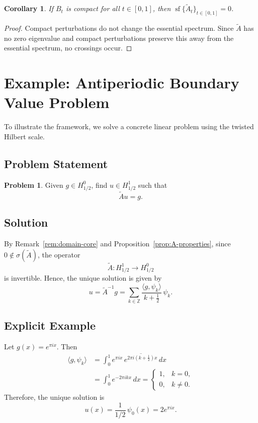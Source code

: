 \documentclass[11pt]{amsart}
\newtheorem{corollary}[theorem]{Corollary}
\theoremstyle{definition}
\newtheorem{problem}[theorem]{Problem}
\theoremstyle{remark}
\begin{document}
\begin{corollary}
If $B_t$ is compact for all $t \in [0,1]$, then $\operatorname{sf}\{\widetilde{A}_t\}_{t \in [0,1]} = 0$.
\end{corollary}

\begin{proof}
Compact perturbations do not change the essential spectrum. Since $\widetilde{A}$ has no zero eigenvalue and compact perturbations preserve this away from the essential spectrum, no crossings occur.
\end{proof}

\section{Example: Antiperiodic Boundary Value Problem}
\label{sec:example}

To illustrate the framework, we solve a concrete linear problem using the twisted Hilbert scale.

\subsection{Problem Statement}

\begin{problem}
Given $g\in H^0_{1/2}$, find $u\in H^1_{1/2}$ such that
\[
\widetilde{A}u = g .
\]
\end{problem}

\subsection{Solution}

By Remark~\ref{rem:domain-core} and Proposition~\ref{prop:A-properties}, since
$0\notin\sigma(\widetilde{A})$, the operator
\[
\widetilde{A}:H^1_{1/2}\to H^0_{1/2}
\]
is invertible. Hence, the unique solution is given by
\[
u = \widetilde{A}^{-1}g
= \sum_{k\in\mathbb{Z}}
\frac{\langle g,\psi_k\rangle}{k+\tfrac12}\,\psi_k .
\]

\subsection{Explicit Example}

Let $g(x)=e^{\pi i x}$. Then
\begin{align*}
\langle g,\psi_k\rangle
&= \int_0^1 e^{\pi i x}\,
\overline{e^{2\pi i (k+\frac12)x}}\,dx \\
&= \int_0^1 e^{-2\pi i k x}\,dx
= \begin{cases}
1, & k=0,\\
0, & k\neq 0.
\end{cases}
\end{align*}
Therefore, the unique solution is
\[
u(x)=\frac{1}{1/2}\,\psi_0(x)=2e^{\pi i x}.
\]
\end{document}
